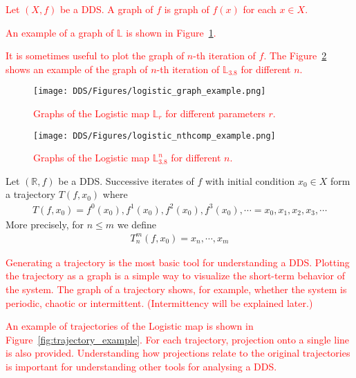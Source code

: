 \begin{definition}[Graph]
\textcolor{red}{
    Let $\left( X, f \right)$ be a DDS. A graph of $f$ is graph of $f(x)$ for each $x \in X$.
}
\end{definition}

\begin{remark}
    \textcolor{red}{
    An example of a graph of $\mathbb{L}$ is shown in Figure~\ref{fig:logistic_graph_example}.
    }
    \par
    \textcolor{red}{
    It is sometimes useful to plot the graph of $n$-th iteration of $f$.
    The Figure~\ref{fig:logistic_nthcomp_example} shows an example of the graph of $n$-th iteration of $\mathbb{L}_{3.8}$ for different $n$.
    }
\end{remark}

\begin{figure}[!h]
    \centering
    \texttt{[image: DDS/Figures/logistic\_graph\_example.png]}
    \caption{
        \textcolor{red}{
        Graphs of the Logistic map $\mathbb{L}_{r}$ for different parameters $r$.
        }
    }
    \label{fig:logistic_graph_example}
\end{figure}

\begin{figure}[!h]
    \centering
    \texttt{[image: DDS/Figures/logistic\_nthcomp\_example.png]}
    \caption{
        \textcolor{red}{
        Graphs of the Logistic map $\mathbb{L}_{3.8}^{n}$ for different $n$.
        }
    }
    \label{fig:logistic_nthcomp_example}
\end{figure}

\begin{definition}[Trajectory]
    Let $\left( \mathbb{R}, f \right)$ be a DDS. Successive iterates of $f$ with initial condition $x_0 \in X$ form a trajectory $T(f, x_0)$ where
    \begin{eqnarray}
        T(f, x_0) = f^0(x_0), f^1(x_0), f^2(x_0), f^3(x_0), \cdots  = x_0, x_1, x_2, x_3, \cdots
    \end{eqnarray}
    More precisely, for $n \leq m$ we define
    \begin{eqnarray}
        T_{n}^{m}(f, x_0) = x_n, \cdots, x_m
    \end{eqnarray}
\end{definition}

\begin{remark}
    \textcolor{red}{
    Generating a trajectory is the most basic tool for understanding a DDS.
    Plotting the trajectory as a graph is a simple way to visualize the short-term behavior of the system.
    The graph of a trajectory shows, for example, whether the system is periodic, chaotic or intermittent. (Intermittency will be explained later.)
    }
    \par
    \textcolor{red}{
    An example of trajectories of the Logistic map is shown in Figure~\ref{fig:trajectory_example}.
    For each trajectory, projection onto a single line is also provided.
    Understanding how projections relate to the original trajectories is important for understanding other tools for analysing a DDS.
    }
\end{remark}

